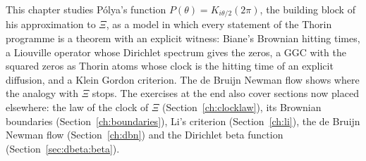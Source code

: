 \label{chap:probability}

This chapter studies P\'olya's function $P(\theta)=K_{i\theta/2}(2\pi)$, the building block of his approximation to $\Xi$, as a model in which every statement of the Thorin programme is a theorem with an explicit witness: Biane's Brownian hitting times, a Liouville operator whose Dirichlet spectrum gives the zeros, a GGC with the squared zeros as Thorin atoms whose clock is the hitting time of an explicit diffusion, and a Klein Gordon criterion. The de Bruijn Newman flow shows where the analogy with $\Xi$ stops. The exercises at the end also cover sections now placed elsewhere: the law of the clock of $\Xi$ (Section~\ref{ch:clocklaw}), its Brownian boundaries (Section~\ref{ch:boundaries}), Li's criterion (Section~\ref{ch:li}), the de Bruijn Newman flow (Section~\ref{ch:dbn}) and the Dirichlet beta function (Section~\ref{sec:dbeta:beta}).

